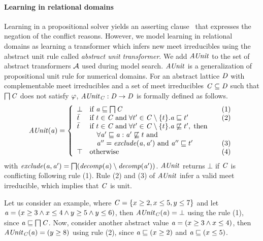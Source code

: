 \paragraph{\textbf{Learning in relational domains}}
Learning in a propositional solver yields an asserting
clause~\cite{cdcl} that expresses the negation of the conflict
reasons.  However, we model learning in relational domains as learning
a transformer which infers new meet irreducibles using the abstract
unit rule called {\em abstract unit transformer}.  We add $\mathit{AUnit}$ to
the set of abstract transformers $\mathcal{A}$ used during model
search. $\mathit{AUnit}$ is a generalization of propositional unit rule for
numerical domains.  For an abstract lattice $\mathit{D}$ with
complementable meet irreducibles and a set of meet irreducibles $\mathit{C}
\subseteq \mathit{D}$ such that $\bigsqcap
\mathit{C}$ does not satisfy $\varphi$, $\mathit{AUnit}_{\mathit{C}}: \mathit{D} \rightarrow
\mathit{D}$ is formally defined as follows.
\[ \aunit(\absval) =
 \left\{\begin{array}{l@{\quad}l@{\qquad}l}
  \bot       & \text{if } \absval \sqsubseteq \bigsqcap \conflictset & (1)\\
  \bar{t}    & \text{if } t \in \conflictset \; \text{and} \; \forall t' \in \conflictset
  \setminus \{t\}. \absval  \sqsubseteq t' & (2) \\
  \bar{t}    & \text{if } t \in \conflictset \; \text{and} \; \forall t' \in \conflictset \setminus \{t\}. \absval
  \not\sqsubseteq t', \; \text{then} \\ 
             & \quad \forall \absval' \sqsubseteq \absval: \absval'
             \not\sqsubseteq t \text{ and} \\ 
             & \quad \absval''=\exclude(\absval,\absval') \text{ and
             }\absval''\sqsubseteq t' & (3) \\
  \top & \text{otherwise} & (4) \\
 \end{array}\right.
\]
with $\mathit{exclude}(\mathit{a},\mathit{a}')=\bigsqcap({\mathit{decomp}}(\mathit{a}) \setminus
{\mathit{decomp}}(\mathit{a}'))$.  $\mathit{AUnit}$ returns $\bot$ if $\mathit{C}$ is
conflicting following rule (1).  Rule (2) and (3) of $\mathit{AUnit}$ infer a
valid meet irreducible, which implies that $\mathit{C}$ is unit.

Let us consider an example, where $\mathit{C} = \{x \geq 2, x
\leq 5, y \leq 7 \}$ and let $\mathit{a} = (x \geq 3\wedge x \leq 4\wedge
y \geq 5\wedge y \leq 6)$, then $\mathit{AUnit}_{\mathit{C}}(\mathit{a}) = \bot$
using the rule (1), since $\mathit{a} \sqsubseteq \bigsqcap\mathit{C}$.  Now,
consider another abstract value $\mathit{a} = (x \geq 3\wedge x \leq 4)$, then
$\mathit{AUnit}_{\mathit{C}}(\mathit{a}) = (y \geq 8)$ using rule (2), since
$\mathit{a} \sqsubseteq (x \geq 2)$ and $\mathit{a} \sqsubseteq (x \leq 5)$.  

